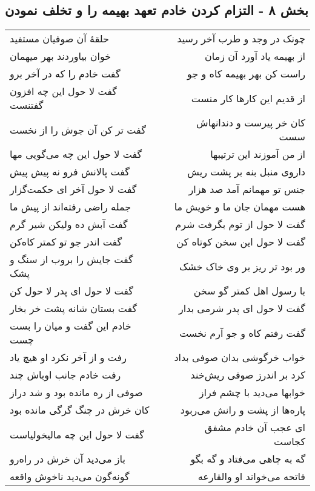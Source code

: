 \begin{center}
\section*{بخش ۸ - التزام کردن خادم تعهد بهیمه را و تخلف نمودن}
\label{sec:sh008}
\begin{longtable}{l p{0.5cm} r}
حلقهٔ آن صوفیان مستفید
&&
چونک در وجد و طرب آخر رسید
\\
خوان بیاوردند بهر میهمان
&&
از بهیمه یاد آورد آن زمان
\\
گفت خادم را که در آخر برو
&&
راست کن بهر بهیمه کاه و جو
\\
گفت لا حول این چه افزون گفتنست
&&
از قدیم این کارها کار منست
\\
گفت تر کن آن جوش را از نخست
&&
کان خر پیرست و دندانهاش سست
\\
گفت لا حول این چه می‌گویی مها
&&
از من آموزند این ترتیبها
\\
گفت پالانش فرو نه پیش پیش
&&
داروی منبل بنه بر پشت ریش
\\
گفت لا حول آخر ای حکمت‌گزار
&&
جنس تو مهمانم آمد صد هزار
\\
جمله راضی رفته‌اند از پیش ما
&&
هست مهمان جان ما و خویش ما
\\
گفت آبش ده ولیکن شیر گرم
&&
گفت لا حول از توم بگرفت شرم
\\
گفت اندر جو تو کمتر کاه‌کن
&&
گفت لا حول این سخن کوتاه کن
\\
گفت جایش را بروب از سنگ و پشک
&&
ور بود تر ریز بر وی خاک خشک
\\
گفت لا حول ای پدر لا حول کن
&&
با رسول اهل کمتر گو سخن
\\
گفت بستان شانه پشت خر بخار
&&
گفت لا حول ای پدر شرمی بدار
\\
خادم این گفت و میان را بست چست
&&
گفت رفتم کاه و جو آرم نخست
\\
رفت و از آخر نکرد او هیچ یاد
&&
خواب خرگوشی بدان صوفی بداد
\\
رفت خادم جانب اوباش چند
&&
کرد بر اندرز صوفی ریش‌خند
\\
صوفی از ره مانده بود و شد دراز
&&
خوابها می‌دید با چشم فراز
\\
کان خرش در چنگ گرگی مانده بود
&&
پاره‌ها از پشت و رانش می‌ربود
\\
گفت لا حول این چه مالیخولیاست
&&
ای عجب آن خادم مشفق کجاست
\\
باز می‌دید آن خرش در راه‌رو
&&
گه به چاهی می‌فتاد و گه بگو
\\
گونه‌گون می‌دید ناخوش واقعه
&&
فاتحه می‌خواند او والقارعه
\\

\end{longtable}
\end{center}
